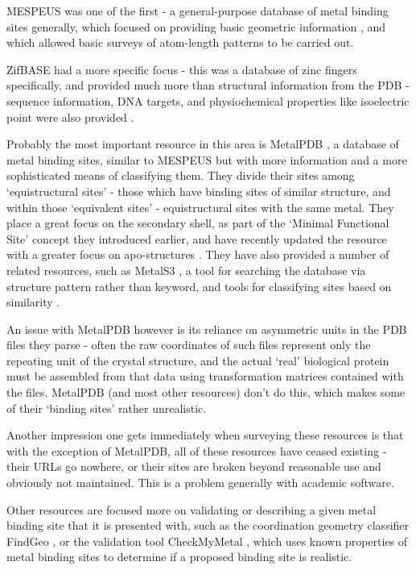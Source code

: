 MESPEUS was one of the first - a general-purpose database of metal binding sites generally, which focused on providing basic geometric information \cite{hsin2008mespeus}, and which allowed basic surveys of atom-length patterns to be carried out.

ZifBASE had a more specific focus - this was a database of zinc fingers specifically, and provided much more than structural information from the PDB - sequence information, DNA targets, and physiochemical properties like isoelectric point were also provided \cite{jayakanthan2009zifbase}.

Probably the most important resource in this area is MetalPDB \cite{andreini2012metalpdb}, a database of metal binding sites, similar to MESPEUS but with more information and a more sophisticated means of classifying them. They divide their sites among `equistructural sites' - those which have binding sites of similar structure, and within those `equivalent sites' - equistructural sites with the same metal. They place a great focus on the secondary shell, as part of the `Minimal Functional Site' concept they introduced earlier, and have recently updated the resource with a greater focus on apo-structures \cite{putignano2017metalpdb}. They have also provided a number of related resources, such as MetalS3 \cite{valasatava2014metals}, a tool for searching the database via structure pattern rather than keyword, and tools for classifying sites based on similarity \cite{sobolev2013web}.

An issue with MetalPDB however is its reliance on asymmetric units in the PDB files they parse - often the raw coordinates of such files represent only the repeating unit of the crystal structure, and the actual `real' biological protein must be assembled from that data using transformation matrices contained with the files. MetalPDB (and most other resources) don't do this, which makes some of their `binding sites' rather unrealistic.

Another impression one gets immediately when surveying these resources is that with the exception of MetalPDB, all of these resources have ceased existing - their URLs go nowhere, or their sites are broken beyond reasonable use and obviously not maintained. This is a problem generally with academic software.

Other resources are focused more on validating or describing a given metal binding site that it is presented with, such as the coordination geometry classifier FindGeo \cite{andreini2012findgeo}, or the validation tool CheckMyMetal \cite{zheng2017checkmymetal}, which uses known properties of metal binding sites to determine if a proposed binding site is realistic.

